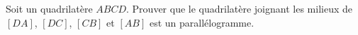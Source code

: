 
\begin{exercice}\label{exosmath-0113}

    Soit un quadrilatère \( ABCD\). Prouver que le quadrilatère joignant les milieux de \( [DA]\), \( [DC]\), \( [CB]\) et \( [AB]\) est un parallélogramme.

\end{exercice}
